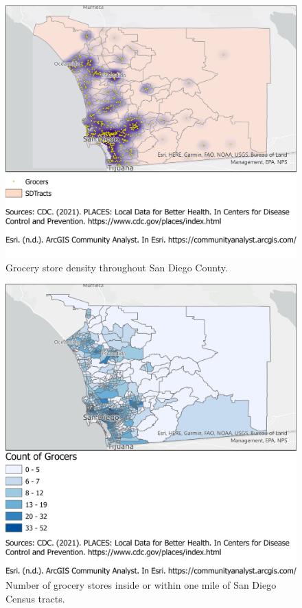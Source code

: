 \documentclass[]{elsarticle} %
\begin{document}
\begin{figure}
\centering
\includegraphics{"../map2.png"}
\caption{Grocery store density throughout San Diego County.\label{fig2}}
\end{figure}

\begin{figure}
\centering
\includegraphics{"../map3.png"}
\caption{Number of grocery stores inside or within one mile of San Diego
Census tracts.\label{fig3}}
\end{figure}
\end{document}
